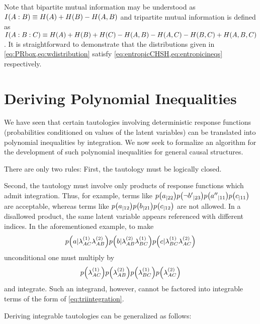 Note that bipartite mutual information may be understood as $I\lparen A:B\rparen\equiv H\lparen A\rparen+H\lparen B\rparen-H\lparen A,B\rparen$ and tripartite mutual information is defined as $I\lparen A:B:C\rparen\equiv H\lparen A\rparen+H\lparen B\rparen+H\lparen C\rparen-H\lparen A,B\rparen-H\lparen A,C\rparen-H\lparen B,C\rparen+H\lparen A,B,C\rparen$. It is straightforward to demonstrate that the distributions given in \cref{eq:PRbox,eq:wdistribution} satisfy  \cref{eq:entropicCHSH,eq:entropicineqs} respectively.



\section{Deriving Polynomial Inequalities}


We have seen that certain tautologies involving deterministic response functions (probabilities conditioned on values of the latent variables) can be translated into polynomial inequalities by integration. We now seek to formalize an algorithm for the development of such polynomial inequalities for general causal structures.

There are only two rules: First, the tautology must be logically closed. 

Second, the tautology must involve only products of response functions which admit integration.
Thus, for example, terms like $\p{a_{|22}}\p{{\nb'}_{|23}}\p{{a''}_{|11}}\p{c_{|11}}$ are acceptable, whereas terms like $\p{a_{|12}}\p{b_{|21}}\p{c_{|12}}$ are not allowed. In a disallowed product, the same latent variable appears referenced with different indices. In the aforementioned example, to make
\begin{align}
\p{a|\lambda^{(1)}_{AC}\lambda^{(2)}_{AB}}\p{b|\lambda^{(2)}_{AB}\lambda^{(1)}_{BC}}\p{c|\lambda^{(1)}_{BC}\lambda^{(2)}_{AC}}
\end{align}
unconditional one must multiply by
\begin{align}
\p{\lambda^{(1)}_{AC}}\p{\lambda^{(2)}_{AB}}\p{\lambda^{(1)}_{BC}}\p{\lambda^{(2)}_{AC}}
\end{align}
and integrate. Such an integrand, however, cannot be factored into integrable terms of the form of \cref{eq:triintegration}.

Deriving integrable tautologies can be generalized as follows:

